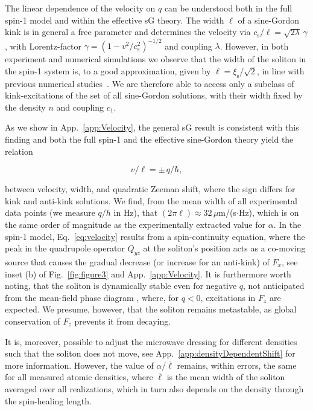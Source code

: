\documentclass[aps,

               pra,
               twocolumn,
               amsmath,
               amssymb,
               superscriptaddress,
               reprint,
               10pt
              ]{revtex4-2}
\begin{document}
The linear dependence of the velocity on $q$ can be understood both in the full spin-1 model and within the effective sG theory.
The width $\ell$ of a sine-Gordon kink is in general a free parameter and determines the velocity via $c_\mathrm{s}/\ell = \sqrt{2\lambda} \, \gamma$, with Lorentz-factor $\gamma = (1-v^2/c_\mathrm{s}^2)^{-1/2}$ and coupling $\lambda$.
However, in both experiment and numerical simulations we observe that the width of the soliton in the spin-1 system is, to a good approximation,
given by $\ell =  \xi_\mathrm{s}/\sqrt{2}$, in line with previous numerical studies~\cite{Yu2021}.
We are therefore able to access only a subclass of kink-excitations of the set of all sine-Gordon solutions, with their width fixed by the density $n$ and coupling $c_1$.

As we show in
App.~\ref{app:Velocity}, the general sG result is consistent with this finding and both the full spin-1 and the effective sine-Gordon theory yield the relation

\begin{equation}
    {v}/{\ell} = \pm \, {q}/\hbar ,
    \label{eq:velocity}
\end{equation}

between velocity, width, and quadratic Zeeman shift, where the sign differs for kink and anti-kink solutions.
We find, from the mean width of all experimental data points (we measure $q/h$ in $\mathrm{Hz}$), that $(2 \pi \ell)\approx 32\,\mu$m/(s$\cdot$Hz), which is on the same order of magnitude as the experimentally extracted value for $\alpha$.
In the spin-1 model, Eq.~\eqref{eq:velocity} results from a spin-continuity equation, where the peak in the quadrupole operator $Q_{yz}$ at the soliton's position acts as a co-moving source that causes the gradual decrease (or increase for an anti-kink) of $F_x$, see inset (b) of Fig.~\ref{fig:figure3} and App.~\ref{app:Velocity}.
It is furthermore worth noting, that the soliton is dynamically stable even for negative $q$, not anticipated from the mean-field phase diagram \cite{Kawaguchi2012}, where, for $q<0$, excitations in $F_z$ are expected.
We presume, however, that the soliton remains metastable, as global conservation of $F_z$ prevents it from decaying.

It is, moreover, possible to adjust the microwave dressing for different densities such that the soliton does not move, see App.~\ref{app:densityDependentShift} for more information.
However, the value of $\alpha / \overline{\ell}$ remains, within errors, the same for all measured atomic densities, where $\overline{\ell}$ is the mean width of the soliton averaged over all realizations, which in turn also depends on the density through the spin-healing length.
\end{document}
